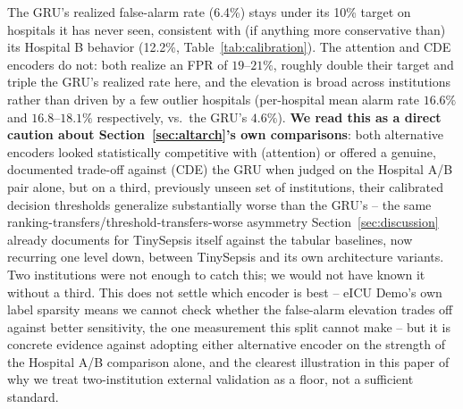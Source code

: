 \documentclass[11pt]{article}
\begin{document}
\begin{table}[t]
\centering
\caption{Zero-shot empirical false-positive rate on eICU Demo (2{,}519 negative-labeled patients, 186 hospitals), at each model's existing Challenge-2019-calibrated conformal threshold (target $\alpha=0.10$).}
\label{tab:eicufpr}

\end{table}

The GRU's realized false-alarm rate (6.4\%) stays under its 10\% target on hospitals it has never seen, consistent with (if anything more conservative than) its Hospital B behavior (12.2\%, Table~\ref{tab:calibration}). The attention and CDE encoders do not: both realize an FPR of $19$--$21\%$, roughly double their target and triple the GRU's realized rate here, and the elevation is broad across institutions rather than driven by a few outlier hospitals (per-hospital mean alarm rate $16.6\%$ and $16.8$--$18.1\%$ respectively, vs.\ the GRU's $4.6\%$). \textbf{We read this as a direct caution about Section~\ref{sec:altarch}'s own comparisons}: both alternative encoders looked statistically competitive with (attention) or offered a genuine, documented trade-off against (CDE) the GRU when judged on the Hospital A/B pair alone, but on a third, previously unseen set of institutions, their calibrated decision thresholds generalize substantially worse than the GRU's -- the same ranking-transfers/threshold-transfers-worse asymmetry Section~\ref{sec:discussion} already documents for TinySepsis itself against the tabular baselines, now recurring one level down, between TinySepsis and its own architecture variants. Two institutions were not enough to catch this; we would not have known it without a third. This does not settle which encoder is best -- eICU Demo's own label sparsity means we cannot check whether the false-alarm elevation trades off against better sensitivity, the one measurement this split cannot make -- but it is concrete evidence against adopting either alternative encoder on the strength of the Hospital A/B comparison alone, and the clearest illustration in this paper of why we treat two-institution external validation as a floor, not a sufficient standard.
\end{document}
